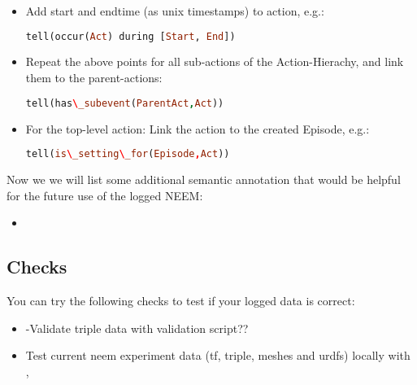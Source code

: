 \begin{itemize}
\begin{itemize}
\begin{lstlisting}[language=Prolog]
			\end{lstlisting}
		\item Add start and endtime (as unix timestamps) to action, e.g.: 
			\begin{lstlisting}[language=Prolog]
tell(occur(Act) during [Start, End])
			\end{lstlisting}
		\item Repeat the above points for all sub-actions of the Action-Hierachy, and link them to the parent-actions:
			\begin{lstlisting}[language=Prolog]
tell(has\_subevent(ParentAct,Act))
			\end{lstlisting}
		\item For the top-level action: Link the action to the created Episode, e.g.: 
			\begin{lstlisting}[language=Prolog]
tell(is\_setting\_for(Episode,Act))
			\end{lstlisting}
	\end{itemize}
\end{itemize}

Now we we will list some additional semantic annotation that would be helpful for the future use of the logged NEEM:

\begin{itemize}
	\item {}
\end{itemize}


\subsection{Checks}


You can try the following checks to test if your logged data is correct:

\begin{itemize}
	\item -Validate triple data with \neem validation script??
	\item Test current neem experiment data (tf, triple, meshes and urdfs) locally with \knowrob, 
\end{itemize}
